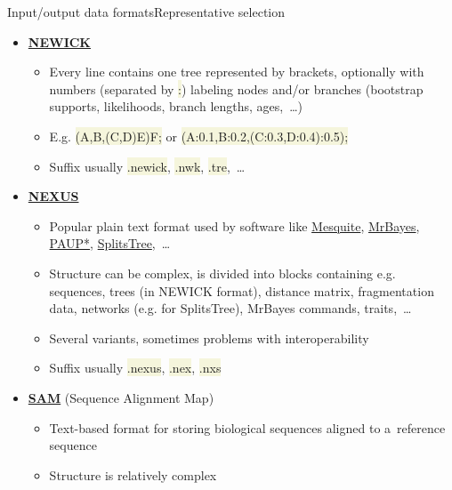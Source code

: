\documentclass[compress, ucs, xelatex, 11pt, xcolor=svgnames, aspectratio=169,
	hyperref={
		bookmarks=true,
		unicode=true,
		colorlinks=true,
		pdftitle={Molecular data in R},
		plainpages=false,
		pdfauthor={Vojtech Zeisek},
		pdfsubject={Course about phylogeny and evolution in R},
		pdfcreator={XeLaTeX},
		pdfkeywords={R, evolution, phylogeny, molecular data},
		linkcolor=Crimson, %
		anchorcolor=Magenta, %
		citecolor=Magenta, %
		filecolor=Magenta, %
		menucolor=Magenta, %
		urlcolor=DodgerBlue, %
		pdftex},
	url={hyphens, lowtilde} %
	]{beamer}
\renewcommand{\texttt}[1]{\colorbox{Beige}{{\ttfamily #1}}}
\begin{document}
\begin{frame}[allowframebreaks]{Input/output data formats}{Representative selection}
\begin{itemize}
\begin{itemize}
			\item Common format for output of modern high throughput sequencing machines (e.g. Illumina)
			\item Commonly compressed by \texttt{gzip} (\texttt{*.gz}), sometimes by other compression application
			\item Suffix usually \texttt{*.fastq}, \texttt{*.fq}, \texttt{*.fastq.gz}, \texttt{*.fq.gz},~\ldots
		\end{itemize}
		\item \href{https://en.wikipedia.org/wiki/Newick_format}{\textbf{NEWICK}}
		\begin{itemize}
			\item Every line contains one tree represented by brackets, optionally with numbers (separated by \texttt{:}) labeling nodes and/or branches (bootstrap supports, likelihoods, branch lengths, ages,~\ldots)
			\item E.g. \texttt{(A,B,(C,D)E)F;} or \texttt{(A:0.1,B:0.2,(C:0.3,D:0.4):0.5);}
			\item Suffix usually \texttt{*.newick}, \texttt{*.nwk}, \texttt{*.tre},~\ldots
		\end{itemize}
		\item \href{https://en.wikipedia.org/wiki/Nexus_file}{\textbf{NEXUS}}
		\begin{itemize}
			\item Popular plain text format used by software like \href{https://mesquiteproject.org/}{Mesquite}, \href{https://nbisweden.github.io/MrBayes/}{MrBayes}, \href{https://paup.phylosolutions.com/}{PAUP*}, \href{http://www.splitstree.org/}{SplitsTree},~\ldots
			\item Structure can be complex, is divided into blocks containing e.g. sequences, trees (in NEWICK format), distance matrix, fragmentation data, networks (e.g. for SplitsTree), MrBayes commands, traits,~\ldots
			\item Several variants, sometimes problems with interoperability
			\item Suffix usually \texttt{*.nexus}, \texttt{*.nex}, \texttt{*.nxs}
		\end{itemize}
		\item \href{https://en.wikipedia.org/wiki/SAM_(file_format)}{\textbf{SAM}} (Sequence Alignment Map)
		\begin{itemize}
			\item Text-based format for storing biological sequences aligned to a~reference sequence
			\item Structure is relatively complex

\end{itemize}
\end{itemize}
\end{frame}
\end{document}
